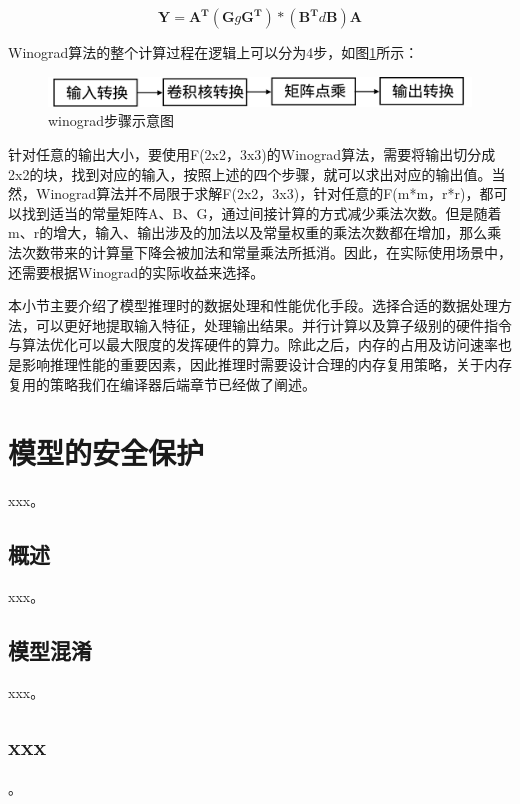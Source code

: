 \begin{equation}\label{equ:ch09-winograd-two-dimension-matrix}
\mathbf{Y}=\mathbf{A^T}(\mathbf{G}g\mathbf{G^T})*(\mathbf{B^T}d\mathbf{B})\mathbf{A}
\end{equation}

Winograd算法的整个计算过程在逻辑上可以分为4步，如图\ref{fig:ch09/ch09-winograd}所示：

\begin{figure}[h]
\centering
\includegraphics[scale=0.5]{figs/ch09/ch09-winograd.png}
\caption{winograd步骤示意图}
\label{fig:ch09/ch09-winograd}
\end{figure}

针对任意的输出大小，要使用F(2x2，3x3)的Winograd算法，需要将输出切分成2x2的块，找到对应的输入，按照上述的四个步骤，就可以求出对应的输出值。当然，Winograd算法并不局限于求解F(2x2，3x3)，针对任意的F(m*m，r*r)，都可以找到适当的常量矩阵A、B、G，通过间接计算的方式减少乘法次数。但是随着m、r的增大，输入、输出涉及的加法以及常量权重的乘法次数都在增加，那么乘法次数带来的计算量下降会被加法和常量乘法所抵消。因此，在实际使用场景中，还需要根据Winograd的实际收益来选择。

本小节主要介绍了模型推理时的数据处理和性能优化手段。选择合适的数据处理方法，可以更好地提取输入特征，处理输出结果。并行计算以及算子级别的硬件指令与算法优化可以最大限度的发挥硬件的算力。除此之后，内存的占用及访问速率也是影响推理性能的重要因素，因此推理时需要设计合理的内存复用策略，关于内存复用的策略我们在编译器后端章节已经做了阐述。


\section{模型的安全保护}\label{sec:ch09/ch09-distributed-inference}
xxx。

\subsection{概述}
xxx。


\subsection{模型混淆}
xxx。

\subsection{xxx}
。


